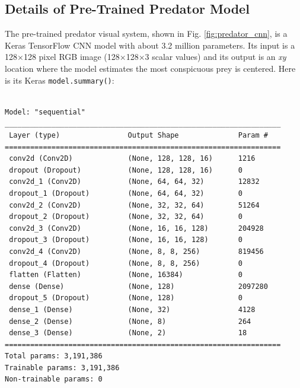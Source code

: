 \documentclass[letterpaper]{article}
\begin{document}
\subsection{Details of Pre-Trained Predator Model}
\label{sec:pretrained_predator_details}
\begin{minipage}{\linewidth}
The pre-trained predator visual system, shown in Fig. \ref{fig:predator_cnn}, is a Keras TensorFlow CNN model with about 3.2 million parameters. Its input is a 128$\times$128 pixel RGB image (128$\times$128$\times$3 scalar values) and its output is an \textit{xy} location where the model estimates the most conspicuous prey is centered. Here is its Keras \texttt{model.summary()}:
\par
\begin{minipage}{\linewidth-1.1cm}
\hspace*{1cm}
\begin{minipage}{\linewidth-1.1cm}
\begin{small}
\begin{verbatim}

Model: "sequential"
_________________________________________________________________
 Layer (type)                Output Shape              Param #
=================================================================
 conv2d (Conv2D)             (None, 128, 128, 16)      1216
 dropout (Dropout)           (None, 128, 128, 16)      0
 conv2d_1 (Conv2D)           (None, 64, 64, 32)        12832
 dropout_1 (Dropout)         (None, 64, 64, 32)        0
 conv2d_2 (Conv2D)           (None, 32, 32, 64)        51264
 dropout_2 (Dropout)         (None, 32, 32, 64)        0
 conv2d_3 (Conv2D)           (None, 16, 16, 128)       204928
 dropout_3 (Dropout)         (None, 16, 16, 128)       0
 conv2d_4 (Conv2D)           (None, 8, 8, 256)         819456
 dropout_4 (Dropout)         (None, 8, 8, 256)         0
 flatten (Flatten)           (None, 16384)             0
 dense (Dense)               (None, 128)               2097280
 dropout_5 (Dropout)         (None, 128)               0
 dense_1 (Dense)             (None, 32)                4128
 dense_2 (Dense)             (None, 8)                 264
 dense_3 (Dense)             (None, 2)                 18
=================================================================
Total params: 3,191,386
Trainable params: 3,191,386
Non-trainable params: 0
\end{verbatim}
\end{small}
\end{minipage}
\end{minipage}
\end{minipage}
\par
\end{document}
